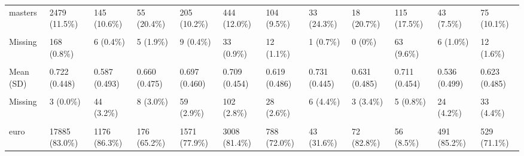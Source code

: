 \documentclass[
  single column]{article}
\begin{document}
\begin{landscape}
\begin{longtable}[t]{llllllllllll}
\addlinespace
masters & 2479 (11.5\%) & 145 (10.6\%) & 55 (20.4\%) & 205 (10.2\%) & 444 (12.0\%) & 104 (9.5\%) & 33 (24.3\%) & 18 (20.7\%) & 115 (17.5\%) & 43 (7.5\%) & 75 (10.1\%)\\
\cellcolor{gray!10}{doctorate} & \cellcolor{gray!10}{835 (3.9\%)} & \cellcolor{gray!10}{42 (3.1\%)} & \cellcolor{gray!10}{24 (8.9\%)} & \cellcolor{gray!10}{54 (2.7\%)} & \cellcolor{gray!10}{158 (4.3\%)} & \cellcolor{gray!10}{47 (4.3\%)} & \cellcolor{gray!10}{8 (5.9\%)} & \cellcolor{gray!10}{8 (9.2\%)} & \cellcolor{gray!10}{57 (8.7\%)} & \cellcolor{gray!10}{4 (0.7\%)} & \cellcolor{gray!10}{9 (1.2\%)}\\
Missing & 168 (0.8\%) & 6 (0.4\%) & 5 (1.9\%) & 9 (0.4\%) & 33 (0.9\%) & 12 (1.1\%) & 1 (0.7\%) & 0 (0\%) & 63 (9.6\%) & 6 (1.0\%) & 12 (1.6\%)\\
\cellcolor{gray!10}{employed\_binary} & \cellcolor{gray!10}{} & \cellcolor{gray!10}{} & \cellcolor{gray!10}{} & \cellcolor{gray!10}{} & \cellcolor{gray!10}{} & \cellcolor{gray!10}{} & \cellcolor{gray!10}{} & \cellcolor{gray!10}{} & \cellcolor{gray!10}{} & \cellcolor{gray!10}{} & \cellcolor{gray!10}{}\\
Mean (SD) & 0.722 (0.448) & 0.587 (0.493) & 0.660 (0.475) & 0.697 (0.460) & 0.709 (0.454) & 0.619 (0.486) & 0.731 (0.445) & 0.631 (0.485) & 0.711 (0.454) & 0.536 (0.499) & 0.623 (0.485)\\
\addlinespace
\cellcolor{gray!10}{Median [Min, Max]} & \cellcolor{gray!10}{1.00 [0, 1.00]} & \cellcolor{gray!10}{1.00 [0, 1.00]} & \cellcolor{gray!10}{1.00 [0, 1.00]} & \cellcolor{gray!10}{1.00 [0, 1.00]} & \cellcolor{gray!10}{1.00 [0, 1.00]} & \cellcolor{gray!10}{1.00 [0, 1.00]} & \cellcolor{gray!10}{1.00 [0, 1.00]} & \cellcolor{gray!10}{1.00 [0, 1.00]} & \cellcolor{gray!10}{1.00 [0, 1.00]} & \cellcolor{gray!10}{1.00 [0, 1.00]} & \cellcolor{gray!10}{1.00 [0, \vphantom{1} 1.00]}\\
Missing & 3 (0.0\%) & 44 (3.2\%) & 8 (3.0\%) & 59 (2.9\%) & 102 (2.8\%) & 28 (2.6\%) & 6 (4.4\%) & 3 (3.4\%) & 5 (0.8\%) & 24 (4.2\%) & 33 (4.4\%)\\
\cellcolor{gray!10}{eth\_cat} & \cellcolor{gray!10}{} & \cellcolor{gray!10}{} & \cellcolor{gray!10}{} & \cellcolor{gray!10}{} & \cellcolor{gray!10}{} & \cellcolor{gray!10}{} & \cellcolor{gray!10}{} & \cellcolor{gray!10}{} & \cellcolor{gray!10}{} & \cellcolor{gray!10}{} & \cellcolor{gray!10}{}\\
euro & 17885 (83.0\%) & 1176 (86.3\%) & 176 (65.2\%) & 1571 (77.9\%) & 3008 (81.4\%) & 788 (72.0\%) & 43 (31.6\%) & 72 (82.8\%) & 56 (8.5\%) & 491 (85.2\%) & 529 (71.1\%)\\

\end{longtable}
\end{landscape}
\end{document}
